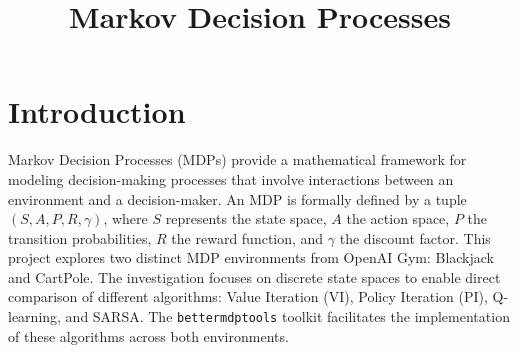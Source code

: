 \documentclass[conference]{IEEEtran}
\begin{document}
\setlength{\itemsep}{0pt} %
\setlength{\parskip}{0pt}
\title{Markov Decision Processes}
\author{}
\maketitle

\section{Introduction}
Markov Decision Processes (MDPs) provide a mathematical framework for modeling decision-making processes that involve interactions between an environment and a decision-maker. An MDP is formally defined by a tuple $(S, A, P, R, \gamma)$, where $S$ represents the state space, $A$ the action space, $P$ the transition probabilities, $R$ the reward function, and $\gamma$ the discount factor. This project explores two distinct MDP environments from OpenAI Gym: Blackjack and CartPole. The investigation focuses on discrete state spaces to enable direct comparison of different algorithms: Value Iteration (VI), Policy Iteration (PI), Q-learning, and SARSA. The \texttt{bettermdptools} toolkit facilitates the implementation of these algorithms across both environments.
\end{document}
